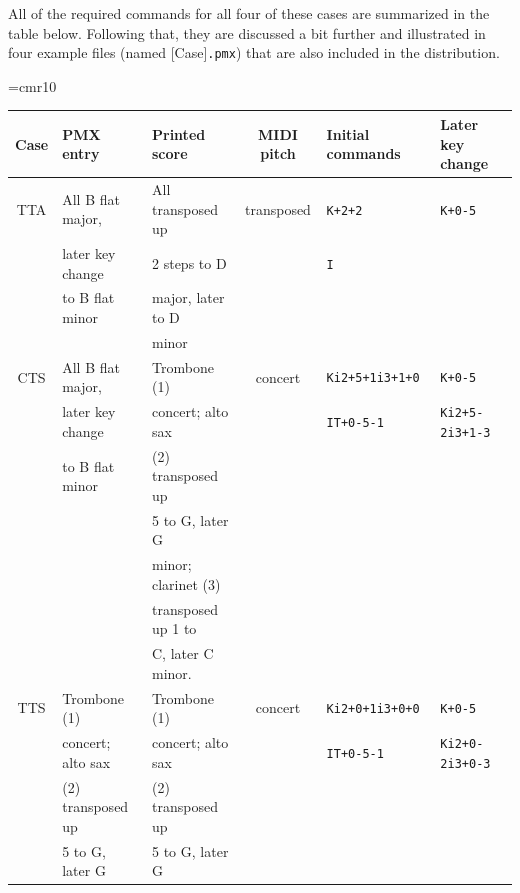 \documentclass[11pt]{article}
\begin{document}
All of the required commands for all four of these cases are summarized in the table
below. Following that, they are discussed a bit further and illustrated in 
four example files (named [Case]{\tt .pmx}) that are also included in the distribution.

\font\smaller=cmr10
{\smaller
\begin{center}
  \begin{tabular}{cllcll}
    \hline
    Case & PMX entry & Printed score & MIDI pitch & Initial commands & Later key change \\
    \hline
     TTA & All B flat major, & All transposed up & transposed & {\tt K+2+2} & {\tt K+0-5} \\
     ~ & later key change      & 2 steps to D     & ~       & {\tt I}     & ~           \\
     ~ & to B flat minor       & major, later to D & ~       & ~           & ~           \\ 
     ~ & ~                     & minor             & ~       & ~           & ~           \\ 
    \hline
     CTS & All B flat major,   & Trombone (1)      & concert & {\tt Ki2+5+1i3+1+0} & {\tt K+0-5} \\
     ~ & later key change      & concert; alto sax & ~       & {\tt IT+0-5-1}     & {\tt Ki2+5-2i3+1-3} \\
     ~ & to B flat minor       & (2) transposed up & ~       & ~           & ~           \\ 
     ~ & ~                     & 5 to G, later G   & ~       & ~           & ~           \\ 
     ~ & ~                     & minor; clarinet (3) & ~       & ~           & ~           \\ 
     ~ & ~                     & transposed up 1 to & ~       & ~           & ~           \\ 
     ~ & ~                     & C, later C minor. & ~       & ~           & ~           \\ 
    \hline
     TTS & Trombone (1)      & Trombone (1)      & concert & {\tt Ki2+0+1i3+0+0} & {\tt K+0-5} \\
     ~ & concert; alto sax     & concert; alto sax & ~       & {\tt IT+0-5-1}     & {\tt Ki2+0-2i3+0-3} \\
     ~ & (2) transposed up     & (2) transposed up & ~       & ~           & ~           \\ 
     ~ & 5 to G, later G       & 5 to G, later G   & ~       & ~           & ~           \\ 

\end{tabular}
\end{center}}
\end{document}
